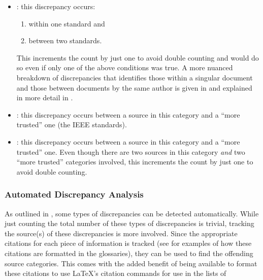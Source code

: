 \begin{itemize}
    \item \textbf{\stds{}}: this discrepancy occurs:
          \begin{enumerate}
              \item within one standard and
              \item between two standards.
          \end{enumerate}
          This increments the count by just one to avoid double counting and
          would do so even if only one of the above conditions was true. A more
          nuanced breakdown of discrepancies that identifies those within a
          singular document and those between documents by the same author is
          given in  and explained in more detail in
          .
    \item \textbf{\metas{}}: this discrepancy occurs between a
          source in this category and a ``more trusted'' one
          (the IEEE standards).
    \item \textbf{\papers{}}: this discrepancy occurs between a
          source in this category and a ``more trusted'' one. Even though there
          are two sources in this category \emph{and} two ``more trusted''
          categories involved, this increments the count by just one to avoid
          double counting.
\end{itemize}

\subsubsection{Automated Discrepancy Analysis}
\label{auto-discrep-analysis}

As outlined in , some types of discrepancies can be detected
automatically. While just counting the total number of these types of
discrepancies is trivial, tracking the source(s) of these discrepancies is more
involved. Since the appropriate citations for each piece of information is
tracked (see  for examples of
how these citations are formatted in the glossaries), they can be used to find
the offending source categories. This comes with the added benefit of being
available to format these citations to use \LaTeX{}'s citation commands for use
in the lists of \autoDiscreps[.]{}

